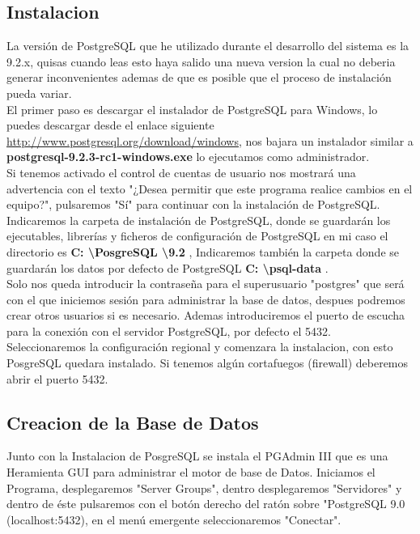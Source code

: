 \subsection{Instalacion}

La versión de PostgreSQL que he utilizado durante el desarrollo del sistema es
la 9.2.x, quisas cuando leas esto haya salido una nueva version la cual no deberia
generar inconvenientes ademas de que es posible que el proceso de instalación
pueda variar.\\[0.2cm]
 
El primer paso es descargar el instalador de PostgreSQL para Windows,
lo puedes descargar desde el enlace siguiente
\url{http://www.postgresql.org/download/windows}, nos bajara un instalador similar
a {\bfseries postgresql-9.2.3-rc1-windows.exe} lo ejecutamos como administrador.\\[0.2cm]

Si tenemos activado el control de cuentas de usuario nos mostrará una advertencia
con el texto "¿Desea permitir que este programa realice cambios en el equipo?",
pulsaremos "Sí" para continuar con la instalación de PostgreSQL.\\[0.2cm]

Indicaremos la carpeta de instalación de PostgreSQL, donde se guardarán los
ejecutables, librerías y ficheros de configuración de PostgreSQL en mi caso el
directorio es {\bfseries C: \textbackslash PosgreSQL \textbackslash 9.2 },
Indicaremos también la carpeta donde se guardarán los datos por defecto
de PostgreSQL {\bfseries C: \textbackslash psql-data }.\\[0.2cm]

Solo nos queda introducir la contraseña para el superusuario "postgres" que
será con el que iniciemos sesión para administrar la base de datos, despues
podremos crear otros usuarios si es necesario. Ademas introduciremos el puerto
de escucha para la conexión con el servidor PostgreSQL, por defecto el 5432.\\[0.2cm]

Seleccionaremos la configuración regional y comenzara la instalacion, con esto
PosgreSQL quedara instalado. Si tenemos algún cortafuegos (firewall) deberemos
abrir el puerto 5432.

\subsection{Creacion de la Base de Datos}

Junto con la Instalacion de PosgreSQL se instala el PGAdmin III que es una Heramienta
GUI para administrar el motor de base de Datos. Iniciamos el Programa,
desplegaremos "Server Groups", dentro desplegaremos "Servidores" y dentro de
éste pulsaremos con el botón derecho del ratón sobre "PostgreSQL 9.0 (localhost:5432),
en el menú emergente seleccionaremos "Conectar".

